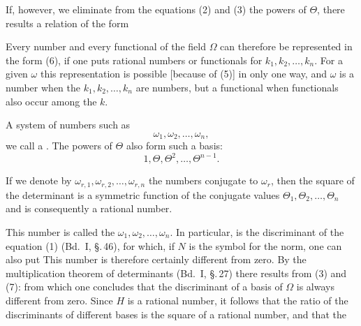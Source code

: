 
If, however, we eliminate from the equations (2) and (3) the powers of $\Theta$, there results a relation of the form

Every number and every functional of the field $\Omega$ can therefore be represented in the form (6), if one puts rational numbers or functionals for $k_1, k_2, \ldots, k_n$. For a given $\omega$ this representation is possible [because of (5)] in only one way, and $\omega$ is a number when the $k_1, k_2, \ldots, k_n$ are numbers, but a functional when functionals also occur among the $k$.

A system of numbers such as
\[
\omega_1, \omega_2, \ldots, \omega_n,
\]
we call a . The powers of $\Theta$ also form such a basis:
\[
1, \Theta, \Theta^2, \ldots, \Theta^{n-1}.
\]

If we denote by $\omega_{r,1}, \omega_{r,2}, \ldots, \omega_{r,n}$ the numbers conjugate to $\omega_r$, then the square of the determinant
is a symmetric function of the conjugate values $\Theta_1, \Theta_2, \ldots, \Theta_n$ and is consequently a rational number.

This number is called the  $\omega_1, \omega_2, \ldots, \omega_n$. In particular,
is the discriminant of the equation (1) (Bd.\ I, \S.\,46), for which, if $N$ is the symbol for the norm, one can also put
This number is therefore certainly different from zero. By the multiplication theorem of determinants (Bd.\ I, \S.\,27) there results from (3) and (7):
from which one concludes that the discriminant of a basis of $\Omega$ is always different from zero. Since $H$ is a rational number, it follows that the ratio of the discriminants of different bases is the square of a rational number, and that the
